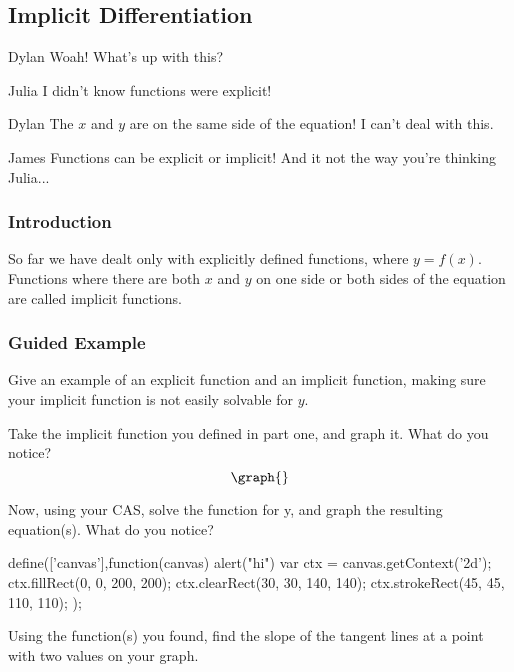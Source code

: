 \documentclass{ximera}
\begin{document}
\subsection{Implicit Differentiation}
\begin{dialogue}
\item[Dylan] Woah! What's up with this?
\item[Julia] I didn't know functions were explicit!
\item[Dylan] The $x$ and $y$ are on the same side of the equation! I can't deal with this.
\item[James] Functions can be explicit or implicit! And it not the way you're thinking Julia...
\end{dialogue}
\subsubsection{Introduction}
So far we have dealt only with explicitly defined functions, where $y=f(x)$.  Functions where there are both $x$ and $y$ on one side or both sides of the equation are called implicit functions.
\subsubsection{Guided Example}
\begin{question}
Give an example of an explicit function and an implicit function, making sure your implicit function is not easily solvable for $y$.
\begin{freeResponse}
\end{freeResponse}
\end{question}
\begin{question}
Take the implicit function you defined in part one, and graph it. What do you notice?
\[
\graph{}
\]
\begin{freeResponse}
\end{freeResponse}
\end{question}
Now, using your CAS, solve the function for y, and graph the resulting equation(s). What do you notice?
\begin{javascript}
define(['canvas'],function(canvas) {alert("hi")
    var ctx = canvas.getContext('2d');
    ctx.fillRect(0, 0, 200, 200);
    ctx.clearRect(30, 30, 140, 140);
    ctx.strokeRect(45, 45, 110, 110);
});
\end{javascript}

Using the function(s) you found, find the slope of the tangent lines at a point with two values on your graph.
\end{document}
